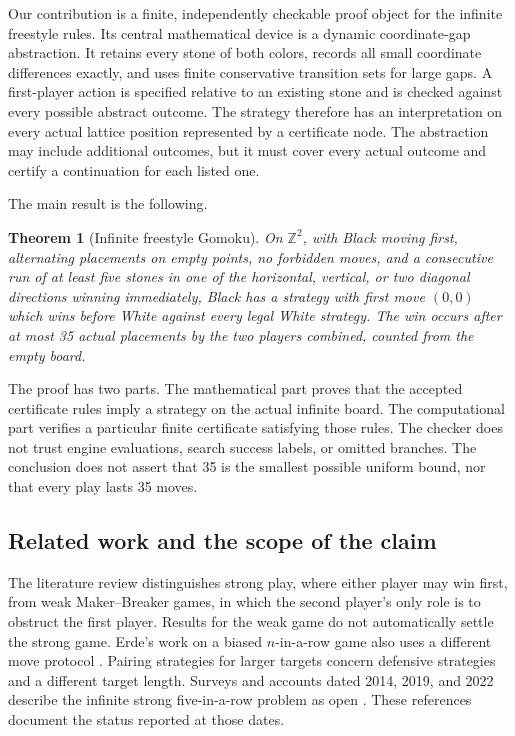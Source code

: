 \documentclass[11pt]{article}
\newtheorem{theorem}{Theorem}[section]
\theoremstyle{definition}
\theoremstyle{remark}
\newcommand{\Z}{\mathbb Z}
\begin{document}
Our contribution is a finite, independently checkable proof object for the
infinite freestyle rules. Its central mathematical device is a dynamic
coordinate-gap abstraction. It retains every stone of both colors, records
all small coordinate differences exactly, and uses finite conservative
transition sets for large gaps. A first-player action is specified relative
to an existing stone and is checked against every possible abstract outcome.
The strategy therefore has an interpretation on every actual lattice
position represented by a certificate node. The abstraction may include additional outcomes, but it must cover every
actual outcome and certify a continuation for each listed one.

The main result is the following.
\begin{theorem}[Infinite freestyle Gomoku]
\label{thm:main}
On $\Z^2$, with Black moving first, alternating placements on empty points,
no forbidden moves, and a consecutive run of at least five stones in one of
the horizontal, vertical, or two diagonal directions winning immediately,
Black has a strategy with first move $(0,0)$ which wins before White against
every legal White strategy. The win occurs after at most 35 actual placements
by the two players combined, counted from the empty board.
\end{theorem}

The proof has two parts. The mathematical part proves that the accepted
certificate rules imply a strategy on the actual infinite board. The
computational part verifies a particular finite certificate satisfying
those rules. The checker does not trust engine evaluations, search success
labels, or omitted branches. The conclusion does not assert that 35 is the
smallest possible uniform bound, nor that every play lasts 35 moves. 

\subsection{Related work and the scope of the claim}
The literature review distinguishes strong play, where either player may
win first, from weak Maker--Breaker games, in which the second player's
only role is to obstruct the first player. Results for the weak game do not
automatically settle the strong game. Erde's work on a biased $n$-in-a-row
game also uses a different move protocol \cite{Erde2012}. Pairing strategies
for larger targets \cite{Gyorffy2019} concern defensive strategies and a
different target length. Surveys and accounts dated 2014, 2019, and 2022
describe the infinite strong five-in-a-row problem as open
\cite{Hefetz2014,Gyorffy2019,Pluhar2022}. These references document the status reported at those dates.
\end{document}
